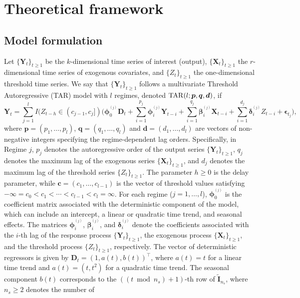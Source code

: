 \section{Theoretical framework}
\subsection{Model formulation}\label{mf}

Let $\{\bm{Y}_t\}_{t\geq 1}$ be the $k$-dimensional time series of interest (output),
$\{\bm{X}_t\}_{t\geq 1}$ the $r$-dimensional time series of exogenous covariates, and
$\{Z_t\}_{t\geq 1}$ the one-dimensional threshold time series.
We say that $\{\bm{Y}_t\}_{t\geq 1}$ follows a multivariate Threshold Autoregressive (TAR)
model with $l$ regimes, denoted ${\rm TAR}(l;\bm{p},\bm{q},\bm{d})$, if
\begin{equation}\label{mtar}
\bm{Y}_t=\sum_{j=1}^l I(Z_{t-h}\in(c_{j-1},c_j])\Big(\!\bm{\phi}_0^{^{(j)}}\!\bm{D}_t
+\sum_{i=1}^{p_j}\bm{\phi}_i^{^{(j)}}\bm{Y}_{t-i}
+\sum_{i=1}^{q_j}\bm{\beta}_i^{^{(j)}}\bm{X}_{t-i}
+\sum_{i=1}^{d_j}\bm{\delta}_i^{^{(j)}}Z_{t-i}
+\bm{\epsilon}_{t_j}\!\Big),
\end{equation}
where $\bm{p}=(p_1,\ldots,p_l)$, $\bm{q}=(q_1,\ldots,q_l)$ and $\bm{d}=(d_1,\ldots,d_l)$ are vectors of 
non-negative integers specifying the regime-dependent lag orders. Specifically, in Regime $j$, $p_j$ denotes the autoregressive order of the output series $\{\bm{Y}_t\}_{t\geq 1}$, $q_j$ denotes the maximum lag of the exogenous series $\{\bm{X}_t\}_{t\geq 1}$, and $d_j$ denotes the maximum lag 
of the threshold series $\{Z_t\}_{t\geq 1}$. The parameter $h\geq 0$ is the delay parameter, while $\bm{c}=(c_1,\ldots,c_{l-1})$ is the vector of threshold values satisfying $-\infty=c_0 < c_1 < \cdots < c_{l-1}< c_l=\infty$. For each regime ($j=1,\ldots,l$), $\bm{\phi}_0^{^{(j)}}$ is the coefficient matrix associated with the deterministic component of the model, which can include an intercept, a linear or quadratic time trend, and seasonal effects. The 
matrices $\bm{\phi}_i^{^{(j)}}$, $\bm{\beta}_i^{^{(j)}}$, and $\bm{\delta}_i^{^{(j)}}$ denote the coefficients associated with the $i$-th lag of the response process $\{\bm{Y}_t\}_{t\geq 1}$, the exogenous process $\{\bm{X}_t\}_{t\geq 1}$, and the threshold process $\{Z_t\}_{t\geq 1}$, respectively. The vector of deterministic regressors is given by $\bm{D}_t = (1,a(t),b(t))^{\!\top}$, where $a(t) = t$ for a linear time trend and $a(t)=(t,t^2)$ for a quadratic time trend. The seasonal component $b(t)$ corresponds to the $((t \bmod n_s)+1)$-th row of $\tilde{\bm{I}}_{n_s}$, where $n_s \ge 2$ denotes the number of
